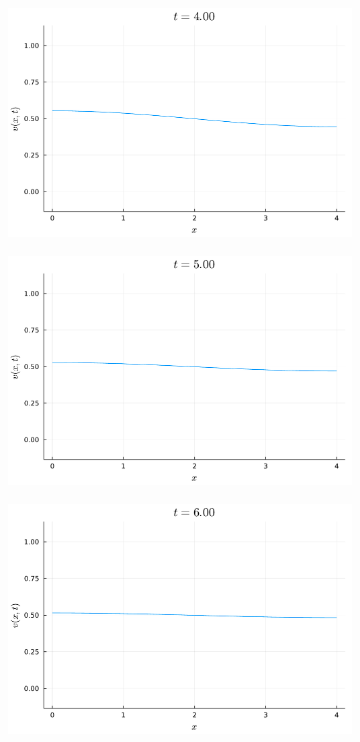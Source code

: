 \documentclass{article}
\begin{document}
\begin{figure}[H]
\begin{subfigure}{0.3\linewidth}
	\end{subfigure}
	\begin{subfigure}{0.3\linewidth}
		\centering
		\includegraphics[width=\linewidth]{prob3_t=4.pdf}
	\end{subfigure}
	\begin{subfigure}{0.3\linewidth}
		\centering
		\includegraphics[width=\linewidth]{prob3_t=5.pdf}
	\end{subfigure}
	\begin{subfigure}{0.3\linewidth}
		\centering
		\includegraphics[width=\linewidth]{prob3_t=6.pdf}
	\end{subfigure}
\end{figure}
\end{document}
